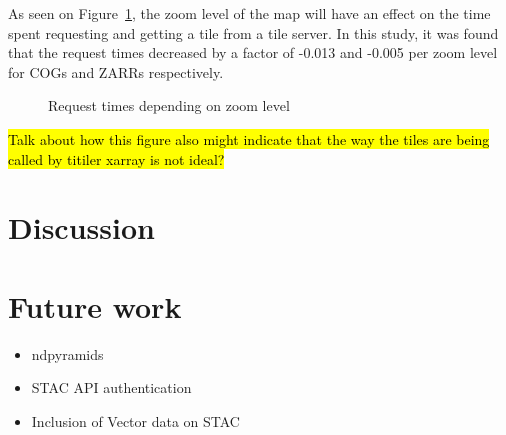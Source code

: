 \documentclass[
  oneside,
  open=any]{scrbook}
\providecommand{\tightlist}{%
  \setlength{\itemsep}{0pt}\setlength{\parskip}{0pt}}\usepackage{longtable,booktabs,array}
\begin{document}
As seen on Figure~\ref{fig-comp-zoom}, the zoom level of the map will
have an effect on the time spent requesting and getting a tile from a
tile server. In this study, it was found that the request times
decreased by a factor of -0.013 and -0.005 per zoom level for COGs and
ZARRs respectively.

\begin{figure}[H]


\caption{\label{fig-comp-zoom}Request times depending on zoom level}

\end{figure}%

\hl{Talk about how this figure also might indicate that the way the tiles are being called by titiler xarray is not ideal?}

\chapter{Discussion}\label{discussion}

\chapter{Future work}\label{future-work}

\begin{itemize}
\tightlist
\item
  ndpyramids
\item
  STAC API authentication
\item
  Inclusion of Vector data on STAC
\end{itemize}
\end{document}
